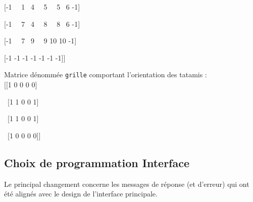  [-1  ~~1  ~4  ~~5  ~~5  ~6 -1]

 [-1  ~~7  ~4  ~~8  ~~8  ~6 -1]

 [-1  ~~7  ~9  ~~9 10 10 -1]

 [-1 -1 -1 -1 -1 -1 -1]]

 \bigskip

    Matrice dénommée \texttt{grille} comportant l’orientation des tatamis :\\

[[1 0 0 0 0]

 ~[1 1 0 0 1]

 ~[1 1 0 0 1]

 ~[1 0 0 0 0]]






\subsection{Choix de programmation Interface}

Le principal changement concerne les messages de réponse (et d’erreur) qui ont été alignés avec le design de l’interface principale.

